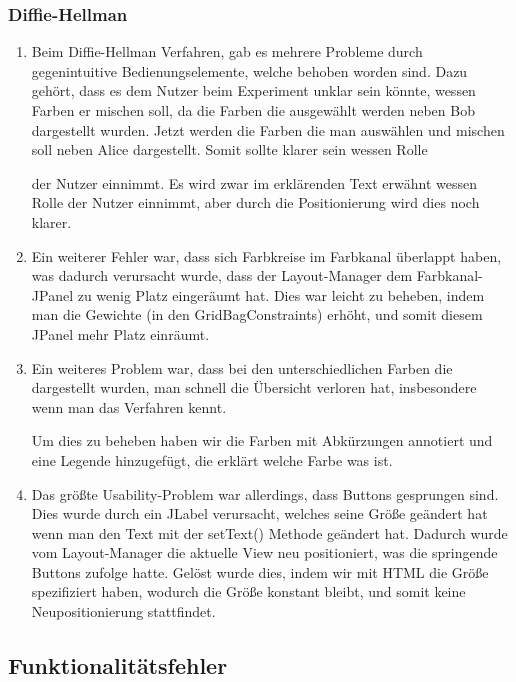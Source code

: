 \documentclass{article}
\begin{document}
     \subsubsection{Diffie-Hellman}
     \begin{enumerate}
         \item Beim Diffie-Hellman Verfahren, gab es mehrere Probleme durch gegenintuitive Bedienungselemente, welche behoben worden sind.
             Dazu gehört, dass es dem Nutzer beim Experiment unklar sein könnte, wessen Farben er mischen soll,
             da die Farben die ausgewählt werden neben Bob dargestellt wurden. Jetzt werden die Farben
             die man auswählen und mischen soll neben Alice dargestellt. Somit sollte klarer sein wessen Rolle

             der Nutzer einnimmt.
             Es wird zwar im erklärenden Text erwähnt wessen Rolle der Nutzer einnimmt, aber durch die Positionierung
             wird dies noch klarer.
         \item Ein weiterer Fehler war, dass sich Farbkreise im Farbkanal überlappt haben,
             was dadurch verursacht wurde, dass der Layout-Manager dem Farbkanal-JPanel zu wenig Platz eingeräumt hat.
             Dies war leicht zu beheben, indem man die Gewichte (in den GridBagConstraints) erhöht,
             und somit diesem JPanel mehr Platz einräumt.

         \item Ein weiteres Problem war, dass bei den unterschiedlichen Farben die dargestellt wurden,
             man schnell die Übersicht verloren hat, insbesondere wenn man das Verfahren kennt.

             Um dies zu beheben haben wir die Farben mit Abkürzungen annotiert und eine Legende hinzugefügt,
             die erklärt welche Farbe was ist.
         \item Das größte Usability-Problem war allerdings, dass Buttons gesprungen sind.
             Dies wurde durch ein JLabel verursacht, welches seine Größe geändert hat
             wenn man den Text mit der setText() Methode geändert hat.
             Dadurch wurde vom Layout-Manager die aktuelle View neu positioniert, was die springende Buttons
             zufolge hatte.
             Gelöst wurde dies, indem wir mit HTML die Größe spezifiziert haben, wodurch die Größe konstant bleibt,
             und somit keine Neupositionierung stattfindet.
     \end{enumerate}

     \subsection{Funktionalitätsfehler}
\end{document}
